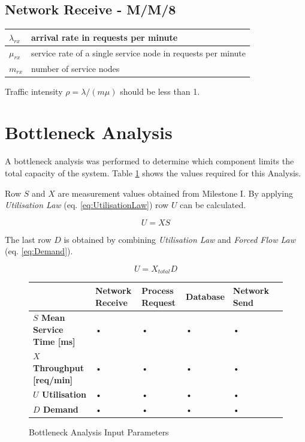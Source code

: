 \documentclass[a4paper]{article}
\begin{document}
\subsection{Network Receive - M/M/8}

\begin{tabular}{|l|l|}
\hline 
$\lambda_{rx}$ & arrival rate in requests per minute \\
\hline 
$\mu_{rx}$ & service rate of a single service node in requests per minute \\
\hline 
$m_{rx}$ & number of service nodes \\
\hline 
\end{tabular}

Traffic intensity $\rho = {\lambda} / {(m \mu)}$ should be less than 1.

\section{Bottleneck Analysis}

A bottleneck analysis was performed to determine which component limits the total capacity of the system. Table \ref{tabular:BottleneckParams} shows the values required for this Analysis.

Row $S$ and $X$ are measurement values obtained from Milestone I. By applying \textit{Utilisation Law} (eq. \ref{eq:UtilisationLaw}) row $U$ can be calculated.   

\begin{equation}
\label{eq:UtilisationLaw}
U = X S
\end{equation}


The last row $D$ is obtained by combining \textit{Utilisation Law} and \textit{Forced Flow Law} (eq. \ref{eq:Demand}). 

\begin{equation}
\label{eq:Demand}
U = X_{total} D
\end{equation}


\begin{figure}[H]
\label{tabular:BottleneckParams}
\begin{center}
\begin{tabular}{|l|l|l|l|l|l|}
\hline 
 & \textbf{Network Receive} & \textbf{Process Request} & \textbf{Database} & \textbf{Network Send}\\ 
\hline
\textbf{$S$ Mean Service Time [ms]} & • & • & • & • \\
\hline 
\textbf{$X$ Throughput [req/min]} & • & • & • & • \\
\hline
\textbf{$U$ Utilisation} & • & • & • & • \\
\hline
\textbf{$D$ Demand} & • & • & • & • \\
\hline
\end{tabular} 
\caption{Bottleneck Analysis Input Parameters}
\end{center}
\end{figure}
\end{document}
